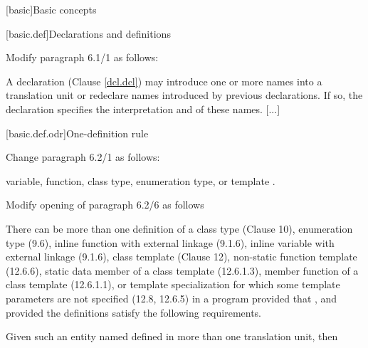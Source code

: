 \setcounter{chapter}{5}
[basic]{Basic concepts}

[basic.def]{Declarations and definitions}

Modify paragraph 6.1/1 as follows:

\begin{std.txt}
  \resetalinea[0]
  \alinea
  A declaration (Clause \ref{dcl.dcl}) may introduce one or more names into a
  translation unit or redeclare names introduced by previous declarations.
  If so, the declaration specifies the interpretation and
   of these names.
  [...]
  \end{std.txt}

[basic.def.odr]{One-definition rule}

Change paragraph 6.2/1 as follows:
\begin{std.txt}
  \resetalinea[0]
  \alinea
  variable, function, class type, enumeration type, or template
  .
\end{std.txt}

Modify opening of paragraph 6.2/6 as follows

\begin{std.txt}
  \resetalinea[5]
  \alinea
  There can be more than one definition of a class type (Clause 10), 
  enumeration type (9.6), inline function with external  
  linkage (9.1.6), 
  inline variable with external  linkage (9.1.6), 
  class template (Clause 12), 
  non-static function template (12.6.6),
  static data member of a class 
  template (12.6.1.3), member function of a class template (12.6.1.1), or 
  template specialization for which some template parameters are not 
  specified (12.8, 12.6.5) in a program provided that
  , 
  and provided the definitions satisfy the 
  following requirements. 
\begin{before}
\end{before}
\begin{after}
\end{after}
  Given such an entity named  defined in more than one 
  translation unit, then
\end{std.txt}

